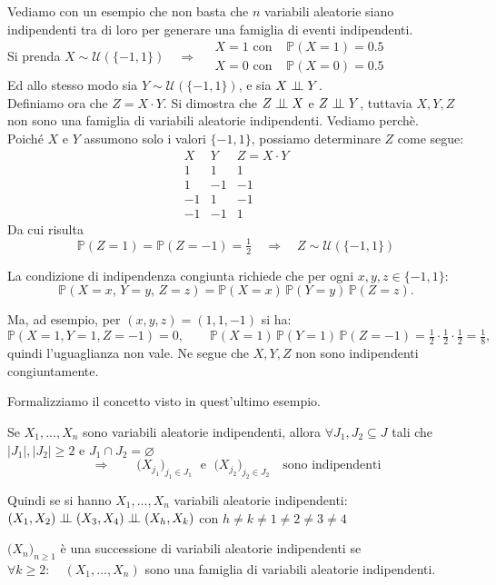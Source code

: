 \begin{esempio}
    Vediamo con un esempio che non basta che $n$ variabili aleatorie siano indipendenti tra di loro per generare una famiglia di eventi indipendenti.\\
    Si prenda $X\sim\mathcal{U}(\{-1,1\})\quad \Rightarrow\quad \begin{aligned}
        X = 1 \text{ con } &\mathbb{P}(X=1) = 0.5\\
        X = 0 \text{ con } &\mathbb{P}(X=0) = 0.5
    \end{aligned}$\\
    Ed allo stesso modo sia $Y\sim\mathcal{U}(\{-1,1\})$, e sia $X\mathrel{\perp\!\!\!\perp} Y$.\\
    Definiamo ora che $Z=X\cdot Y$. Si dimostra che $Z\mathrel{\perp\!\!\!\perp} X$ e $Z\mathrel{\perp\!\!\!\perp} Y$, tuttavia $X, Y, Z$ non sono una famiglia di variabili aleatorie indipendenti. Vediamo perchè.\\

    Poiché $X$ e $Y$ assumono solo i valori $\{-1,1\}$, possiamo determinare $Z$ come segue:
\[
\begin{array}{r|r|r}
X & Y & Z = X \cdot Y\\
\hline
1 & 1 & 1\\
1 & -1 & -1\\
-1 & 1 & -1\\
-1 & -1 & 1
\end{array}
\]
Da cui risulta
\[
\mathbb{P}(Z = 1) = \mathbb{P}(Z = -1) = \tfrac12 \quad \Rightarrow \quad Z \sim \mathcal{U}(\{-1,1\})
\]


\medskip 
\noindent La condizione di indipendenza congiunta richiede che per ogni $x,y,z \in \{-1,1\}$:
\[
\mathbb{P}(X = x,\, Y = y,\, Z = z)
= \mathbb{P}(X = x)\,\mathbb{P}(Y = y)\,\mathbb{P}(Z = z).
\]

Ma, ad esempio, per $(x,y,z) = (1,1,-1)$ si ha:
\[
\mathbb{P}(X=1, Y=1, Z=-1) = 0,
\qquad
\mathbb{P}(X=1)\,\mathbb{P}(Y=1)\,\mathbb{P}(Z=-1) 
= \tfrac12 \cdot \tfrac12 \cdot \tfrac12 = \tfrac18,
\]
quindi l’uguaglianza non vale. Ne segue che $X,Y,Z$ non sono indipendenti congiuntamente.
\end{esempio}

\newpage 
\noindent Formalizziamo il concetto visto in quest'ultimo esempio.

\begin{proposizione}
    Se $X_1, ..., X_n$ sono variabili aleatorie indipendenti, allora $\forall J_1, J_2\subseteq J$ tali che $|J_1|, |J_2| \geq 2$ e $J_1\cap J_2=\varnothing$
    \[\Rightarrow\qquad \bigl(X_{j_1}\bigr)_{j_1 \in J_1}\; \text{ e }\;\bigl(X_{j_2}\bigr)_{j_2 \in J_2}\quad \text{sono indipendenti}\]
\end{proposizione}
\noindent Quindi se si hanno $X_1, ..., X_n$ variabili aleatorie indipendenti: $(X_1,X_2) \mathrel{\perp\!\!\!\perp} (X_3, X_4)\mathrel{\perp\!\!\!\perp} (X_h, X_k)$ con $h\neq k\neq1\neq2\neq3\neq4$

\begin{definizione}
    $\bigl(X_n\bigr)_{n\geq1}$ è una successione di variabili aleatorie indipendenti se $\forall k\geq2:\quad (X_1, ..., X_n)$ sono una famiglia di variabili aleatorie indipendenti.
\end{definizione}
